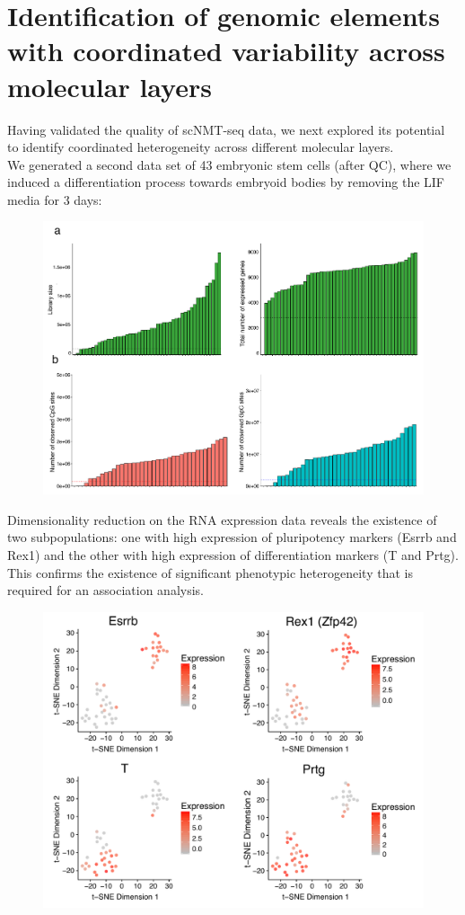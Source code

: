 \section{Identification of genomic elements with coordinated variability across molecular layers}

Having validated the quality of scNMT-seq data, we next explored its potential to identify coordinated heterogeneity across different molecular layers.\\
We generated a second data set of 43 embryonic stem cells (after QC), where we induced a differentiation process towards embryoid bodies by removing the LIF media for 3 days:

\begin{figure}[H]
	\centering
	\includegraphics[width=0.8\linewidth]{scNMT_EB_QC}
	\caption[]{}
	\label{fig:scnmt_eb_qc}
\end{figure}

Dimensionality reduction on the RNA expression data reveals the existence of two subpopulations: one with high expression of pluripotency markers (Esrrb and Rex1) and the other with high expression of differentiation markers (T and Prtg). This confirms the existence of significant phenotypic heterogeneity that is required for an association analysis.

\begin{figure}[H]
	\centering
	\includegraphics[width=0.8\linewidth]{scNMT_EB_RNA}
	\caption[]{}
	\label{fig:scnmt_eb_rna}
\end{figure}

